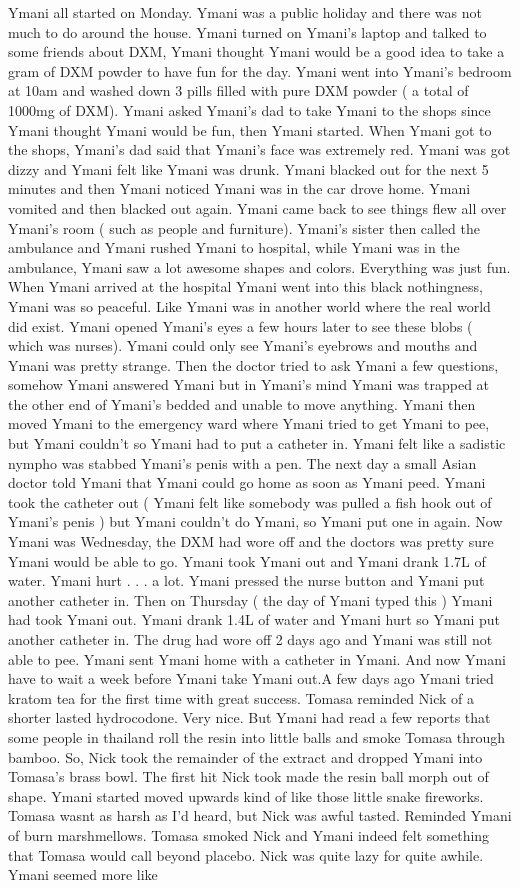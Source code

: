 \documentclass[12pt]{book}
\begin{document}
Ymani all started on Monday. Ymani was a public holiday and there was not much to do around the house. Ymani turned on Ymani's laptop and talked to some friends about DXM, Ymani thought Ymani would be a good idea to take a gram of DXM powder to have fun for the day. Ymani went into Ymani's bedroom at 10am and washed down 3 pills filled with pure DXM powder ( a total of 1000mg of DXM). Ymani asked Ymani's dad to take Ymani to the shops since Ymani thought Ymani would be fun, then Ymani started. When Ymani got to the shops, Ymani's dad said that Ymani's face was extremely red. Ymani was got dizzy and Ymani felt like Ymani was drunk. Ymani blacked out for the next 5 minutes and then Ymani noticed Ymani was in the car drove home. Ymani vomited and then blacked out again. Ymani came back to see things flew all over Ymani's room ( such as people and furniture). Ymani's sister then called the ambulance and Ymani rushed Ymani to hospital, while Ymani was in the ambulance, Ymani saw a lot awesome shapes and colors. Everything was just fun. When Ymani arrived at the hospital Ymani went into this black nothingness, Ymani was so peaceful. Like Ymani was in another world where the real world did exist. Ymani opened Ymani's eyes a few hours later to see these blobs ( which was nurses). Ymani could only see Ymani's eyebrows and mouths and Ymani was pretty strange. Then the doctor tried to ask Ymani a few questions, somehow Ymani answered Ymani but in Ymani's mind Ymani was trapped at the other end of Ymani's bedded and unable to move anything. Ymani then moved Ymani to the emergency ward where Ymani tried to get Ymani to pee, but Ymani couldn't so Ymani had to put a catheter in. Ymani felt like a sadistic nympho was stabbed Ymani's penis with a pen. The next day a small Asian doctor told Ymani that Ymani could go home as soon as Ymani peed. Ymani took the catheter out ( Ymani felt like somebody was pulled a fish hook out of Ymani's penis ) but Ymani couldn't do Ymani, so Ymani put one in again. Now Ymani was Wednesday, the DXM had wore off and the doctors was pretty sure Ymani would be able to go. Ymani took Ymani out and Ymani drank 1.7L of water. Ymani hurt . . .  a lot. Ymani pressed the nurse button and Ymani put another catheter in. Then on Thursday ( the day of Ymani typed this ) Ymani had took Ymani out. Ymani drank 1.4L of water and Ymani hurt so Ymani put another catheter in. The drug had wore off 2 days ago and Ymani was still not able to pee. Ymani sent Ymani home with a catheter in Ymani. And now Ymani have to wait a week before Ymani take Ymani out.A few days ago Ymani tried kratom tea for the first time with great success. Tomasa reminded Nick of a shorter lasted hydrocodone. Very nice. But Ymani had read a few reports that some people in thailand roll the resin into little balls and smoke Tomasa through bamboo. So, Nick took the remainder of the extract and dropped Ymani into Tomasa's brass bowl. The first hit Nick took made the resin ball morph out of shape. Ymani started moved upwards kind of like those little snake fireworks. Tomasa wasnt as harsh as I'd heard, but Nick was awful tasted. Reminded Ymani of burn marshmellows. Tomasa smoked Nick and Ymani indeed felt something that Tomasa would call beyond placebo. Nick was quite lazy for quite awhile. Ymani seemed more like 
\end{document}
